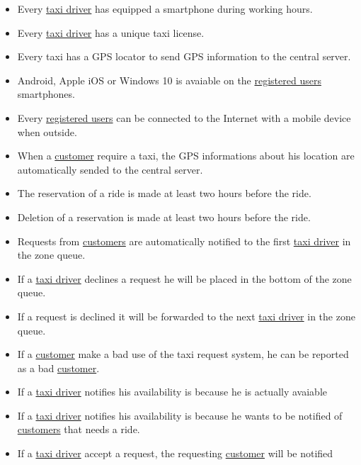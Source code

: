 			\begin{itemize}
				\item Every \hyperref[sec:tdriver]{taxi driver} has equipped a smartphone during working hours.

				\item Every \hyperref[sec:tdriver]{taxi driver} has a unique taxi license.

				\item Every taxi has a GPS locator to send GPS information to the central server.

				\item Android, Apple iOS or Windows 10 is avaiable on the \hyperref[sec:ruser]{registered users} smartphones.

				\item Every \hyperref[sec:ruser]{registered users} can be connected to the Internet with a mobile device when outside.

				\item When a \hyperref[sec:customer]{customer} require a taxi, the GPS informations about his location are automatically sended to the central server.

				\item The reservation of a ride is made at least two hours before the ride.

				\item Deletion of a reservation is made at least two hours before the ride.

				\item Requests from \hyperref[sec:customer]{customers} are automatically notified to the first \hyperref[sec:tdriver]{taxi driver} in the zone queue.

				\item If a \hyperref[sec:tdriver]{taxi driver} declines a request he will be placed in the bottom of the zone queue.

				\item If a request is declined it will be forwarded to the next \hyperref[sec:tdriver]{taxi driver} in the zone queue.

				\item If a \hyperref[sec:customer]{customer} make a bad use of the taxi request system, he can be reported as a bad \hyperref[sec:customer]{customer}.

				\item If a \hyperref[sec:tdriver]{taxi driver} notifies his availability is because he is actually avaiable

				\item If a \hyperref[sec:tdriver]{taxi driver} notifies his availability is because he wants to be notified of \hyperref[sec:customer]{customers} that needs a ride.

				\item If a \hyperref[sec:tdriver]{taxi driver} accept a request, the requesting \hyperref[sec:customer]{customer} will be notified
			\end{itemize}

